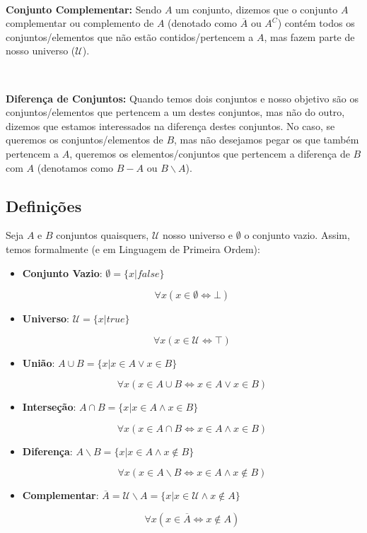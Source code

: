 $\qquad$

\textbf{Conjunto Complementar:} Sendo $A$ um conjunto, dizemos que o conjunto $A$ complementar ou complemento de $A$ (denotado como $\overline A$ ou $A^C$) contém todos os conjuntos/elementos que não estão contidos/pertencem a $A$, mas fazem parte de nosso universo ($\mathcal U$).

$\qquad$

\textbf{Diferença de Conjuntos:} Quando temos dois conjuntos e nosso objetivo são os conjuntos/elementos que pertencem a um destes conjuntos, mas não do outro, dizemos que estamos interessados na diferença destes conjuntos. No caso, se queremos os conjuntos/elementos de $B$, mas não desejamos pegar os que também pertencem a $A$, queremos os elementos/conjuntos que pertencem a diferença de $B$ com $A$ (denotamos como $B-A$ ou $B \backslash A$).

\subsection{Definições}

Seja $A$ e $B$ conjuntos quaisquers, $\mathcal{U}$ nosso universo e $\emptyset$ o conjunto vazio. Assim, temos formalmente (e em Linguagem de Primeira Ordem):

\begin{itemize}
\item \textbf{Conjunto Vazio}: $\emptyset = \{x | false\}$

\[\forall x (x \in \emptyset \iff \bot)\]

\qquad

\item \textbf{Universo}: $\mathcal{U} = \{x | true \}$

\[\forall x (x \in \mathcal{U} \iff \top)\]

\qquad

\item \textbf{União}: $A \cup B = \{x | x \in A \vee x \in B\}$

\[\forall x (x \in A \cup B \iff x \in A \vee x \in B)\]

\qquad

\item \textbf{Interseção}: $A \cap B = \{x | x \in A \wedge x \in B\}$

\[\forall x (x \in A \cap B \iff x \in A \wedge x \in B)\]

\qquad

\item \textbf{Diferença}: $A \backslash B = \{x | x \in A \wedge x \notin B\}$

\[\forall x (x \in A \backslash B \iff x \in A \wedge x \notin B)\]

\qquad

\item \textbf{Complementar}: $\overline A = \mathcal{U} \backslash A = \{x | x \in \mathcal{U} \land x \notin A\}$

\[\forall x (x \in \overline A \iff x \notin A)\]
\end{itemize} 

